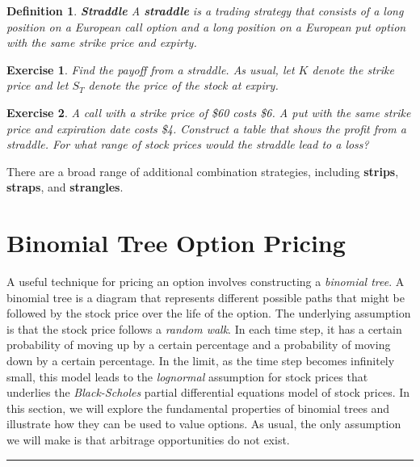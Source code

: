 \documentclass[letterpaper,10pt]{article}
\newtheorem{df}{Definition}[section]
\newtheorem{ex}{Exercise}
\begin{document}
\begin{df}{\bf Straddle}
A {\bf straddle} is a trading strategy that consists of a long position on a European call option and a long position on a European put option with the same strike price and expirty.
\end{df}



\begin{ex}
Find the payoff from a straddle.  As usual, let $K$ denote the strike price and let $S_T$ denote the price of the stock at expiry.
\end{ex}



\begin{ex}
A call with a strike price of \$60 costs \$6. A put with the same strike price and expiration date costs \$4. Construct a table that shows the profit from a straddle. For what range of stock prices would the straddle lead to a loss?
\end{ex}

\noindent There are a broad range of additional combination strategies, including {\bf strips}, {\bf straps}, and {\bf strangles}.

\newpage
	
\section{Binomial Tree Option Pricing}



A useful technique for pricing an option involves constructing a {\em binomial tree}.  A binomial tree is a diagram that represents different possible paths that might be followed by the stock price over the life of the option.  The underlying assumption is that the stock price follows a {\em random walk}.  In each time step, it has a certain probability of moving up by a certain percentage and a probability of moving down by a certain percentage.  In the limit, as the time step becomes infinitely small, this model leads to the {\em lognormal} assumption for stock prices that underlies the {\em Black-Scholes} partial differential equations model of stock prices.  In this section, we will explore the fundamental properties of binomial trees and illustrate how they can be used to value options.  As usual, the only assumption we will make is that arbitrage opportunities do not exist.  

\bigskip

\hrule
\end{document}
